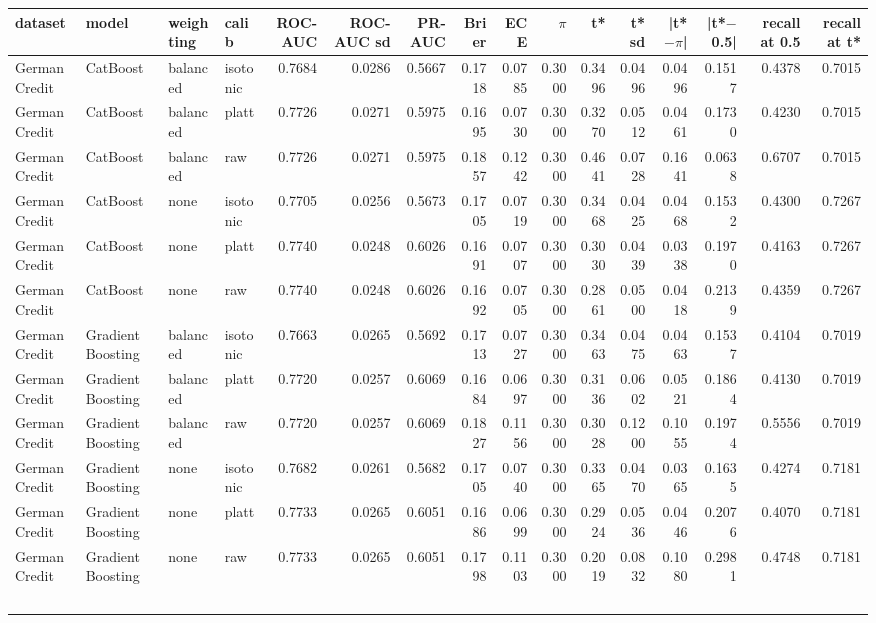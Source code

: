 \begin{tabular}{llllrrrrrrrrrrrr}
\toprule
dataset & model & weighting & calib & ROC-AUC & ROC-AUC sd & PR-AUC & Brier & ECE & $\pi$ & t* & t* sd & |t*$-$$\pi$| & |t*$-$0.5| & recall at 0.5 & recall at t* \\
\midrule
German Credit & CatBoost & balanced & isotonic & 0.7684 & 0.0286 & 0.5667 & 0.1718 & 0.0785 & 0.3000 & 0.3496 & 0.0496 & 0.0496 & 0.1517 & 0.4378 & 0.7015 \\
German Credit & CatBoost & balanced & platt & 0.7726 & 0.0271 & 0.5975 & 0.1695 & 0.0730 & 0.3000 & 0.3270 & 0.0512 & 0.0461 & 0.1730 & 0.4230 & 0.7015 \\
German Credit & CatBoost & balanced & raw & 0.7726 & 0.0271 & 0.5975 & 0.1857 & 0.1242 & 0.3000 & 0.4641 & 0.0728 & 0.1641 & 0.0638 & 0.6707 & 0.7015 \\
German Credit & CatBoost & none & isotonic & 0.7705 & 0.0256 & 0.5673 & 0.1705 & 0.0719 & 0.3000 & 0.3468 & 0.0425 & 0.0468 & 0.1532 & 0.4300 & 0.7267 \\
German Credit & CatBoost & none & platt & 0.7740 & 0.0248 & 0.6026 & 0.1691 & 0.0707 & 0.3000 & 0.3030 & 0.0439 & 0.0338 & 0.1970 & 0.4163 & 0.7267 \\
German Credit & CatBoost & none & raw & 0.7740 & 0.0248 & 0.6026 & 0.1692 & 0.0705 & 0.3000 & 0.2861 & 0.0500 & 0.0418 & 0.2139 & 0.4359 & 0.7267 \\
German Credit & Gradient Boosting & balanced & isotonic & 0.7663 & 0.0265 & 0.5692 & 0.1713 & 0.0727 & 0.3000 & 0.3463 & 0.0475 & 0.0463 & 0.1537 & 0.4104 & 0.7019 \\
German Credit & Gradient Boosting & balanced & platt & 0.7720 & 0.0257 & 0.6069 & 0.1684 & 0.0697 & 0.3000 & 0.3136 & 0.0602 & 0.0521 & 0.1864 & 0.4130 & 0.7019 \\
German Credit & Gradient Boosting & balanced & raw & 0.7720 & 0.0257 & 0.6069 & 0.1827 & 0.1156 & 0.3000 & 0.3028 & 0.1200 & 0.1055 & 0.1974 & 0.5556 & 0.7019 \\
German Credit & Gradient Boosting & none & isotonic & 0.7682 & 0.0261 & 0.5682 & 0.1705 & 0.0740 & 0.3000 & 0.3365 & 0.0470 & 0.0365 & 0.1635 & 0.4274 & 0.7181 \\
German Credit & Gradient Boosting & none & platt & 0.7733 & 0.0265 & 0.6051 & 0.1686 & 0.0699 & 0.3000 & 0.2924 & 0.0536 & 0.0446 & 0.2076 & 0.4070 & 0.7181 \\
German Credit & Gradient Boosting & none & raw & 0.7733 & 0.0265 & 0.6051 & 0.1798 & 0.1103 & 0.3000 & 0.2019 & 0.0832 & 0.1080 & 0.2981 & 0.4748 & 0.7181 \\
$$
\end{tabular}

